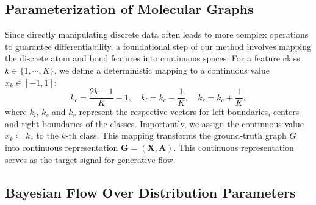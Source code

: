 \documentclass[journal,twoside,web]{ieeecolor}
\begin{document}
\subsection{Parameterization of Molecular Graphs}


Since directly manipulating discrete data often leads to more complex operations to guarantee differentiability, a foundational step of our method involves mapping the discrete atom and bond features into continuous spaces. For a feature class $k \in \{1, \cdots, K\}$, we define a deterministic mapping to a continuous value $x_k \in [-1, 1]$:
\begin{equation}
    k_c = \frac{2k-1}{K} - 1, \quad k_l = k_c - \frac{1}{K},\quad k_r = k_c + \frac{1}{K},
\label{eq:class-mapping}
\end{equation}
where $k_l$, $k_c$ and $k_r$ represent the respective vectors for left boundaries, centers and right boundaries of the classes. Importantly, we assign the continuous value $x_k \coloneqq k_c$ to the $k$-th class. This mapping transforms the ground-truth graph $G$ into continuous representation $\mathbf{G}=(\mathbf{X}, \mathbf{A})$. This continuous representation serves as the target signal for generative flow.

\subsection{Bayesian Flow Over Distribution Parameters}
\end{document}
